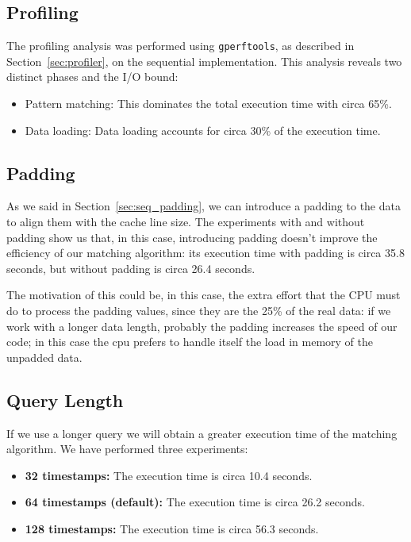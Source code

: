 \subsection{Profiling}
The profiling analysis was performed using \texttt{gperftools}, as described in Section~\ref{sec:profiler}, on the sequential implementation. This analysis reveals two distinct phases and the I/O bound:
\begin{itemize}
    \item Pattern matching: This dominates the total execution time with circa 65\%.
    \item Data loading: Data loading accounts for circa 30\% of the execution time.
\end{itemize}

\subsection{Padding}
\label{sec:analysis_padding}
As we said in Section~\ref{sec:seq_padding}, we can introduce a padding to the data to align them with the cache line size. The experiments with and without padding show us that, in this case, introducing padding doesn't improve the efficiency of our matching algorithm: its execution time with padding is circa 35.8 seconds, but without padding is circa 26.4 seconds.

The motivation of this could be, in this case, the extra effort that the CPU must do to process the padding values, since they are the 25\% of the real data: if we work with a longer data length, probably the padding increases the speed of our code; in this case the cpu prefers to handle itself the load in memory of the unpadded data.

\subsection{Query Length}
\label{sec:seq_analysis_query_lenght}
If we use a longer query we will obtain a greater execution time of the matching algorithm. We have performed three experiments:
\begin{itemize}
    \item \textbf{32 timestamps:} The execution time is circa 10.4 seconds.
    \item \textbf{64 timestamps (default):} The execution time is circa 26.2 seconds.
    \item \textbf{128 timestamps:} The execution time is circa 56.3 seconds.
\end{itemize}

